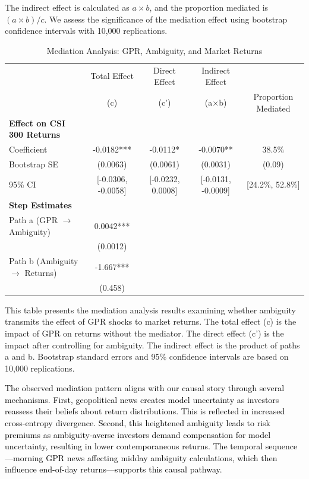 \documentclass[preprint,12pt,authoryear]{elsarticle}
\begin{document}
The indirect effect is calculated as $a \times b$, and the proportion mediated is $(a \times b) / c$. We assess the significance of the mediation effect using bootstrap confidence intervals with 10,000 replications.

\begin{table}
\centering
\caption{Mediation Analysis: GPR, Ambiguity, and Market Returns}
\label{tab:mediation}
\begin{threeparttable}
\begin{tabular*}{\textwidth}{@{\extracolsep{\fill}} lcccc @{\extracolsep{\fill}}}
\toprule
& Total Effect & Direct Effect & Indirect Effect & \\
& (c) & (c') & (a$\times$b) & Proportion Mediated \\
\midrule
\midrule
\textbf{Effect on CSI 300 Returns} & & & & \\
Coefficient & -0.0182*** & -0.0112* & -0.0070** & 38.5\% \\
Bootstrap SE & (0.0063) & (0.0061) & (0.0031) & (0.09) \\
95\% CI & [-0.0306, -0.0058] & [-0.0232, 0.0008] & [-0.0131, -0.0009] & [24.2\%, 52.8\%] \\
\midrule
\textbf{Step Estimates} & & & & \\
Path a (GPR $\rightarrow$ Ambiguity) & 0.0042*** & & & \\
& (0.0012) & & & \\
Path b (Ambiguity $\rightarrow$ Returns) & -1.667*** & & & \\
& (0.458) & & & \\
\bottomrule
\end{tabular*}
\begin{tablenotes}[flushleft]
\small
\item[] This table presents the mediation analysis results examining whether ambiguity transmits the effect of GPR shocks to market returns. The total effect (c) is the impact of GPR on returns without the mediator. The direct effect (c') is the impact after controlling for ambiguity. The indirect effect is the product of paths a and b. Bootstrap standard errors and 95\% confidence intervals are based on 10,000 replications.
\end{tablenotes}
\end{threeparttable}
\end{table}

\textcolor{black}{The observed mediation pattern aligns with our causal story through several mechanisms. First, geopolitical news creates model uncertainty as investors reassess their beliefs about return distributions. This is reflected in increased cross-entropy divergence. Second, this heightened ambiguity leads to risk premiums as ambiguity-averse investors demand compensation for model uncertainty, resulting in lower contemporaneous returns. The temporal sequence---morning GPR news affecting midday ambiguity calculations, which then influence end-of-day returns---supports this causal pathway.}
\end{document}
